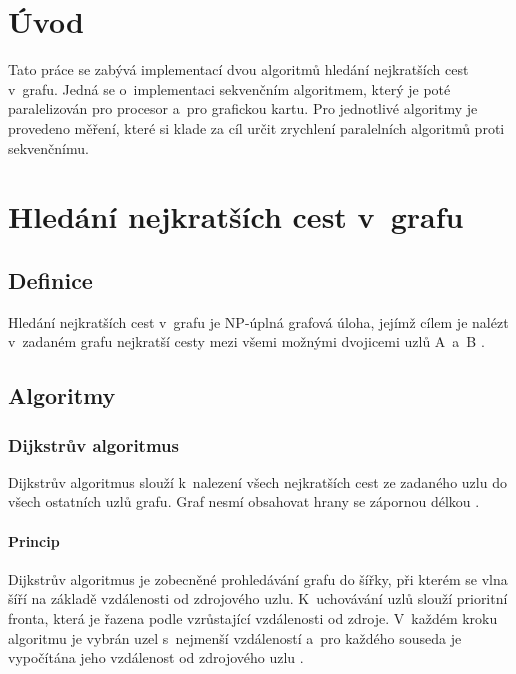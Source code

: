 
\clearpage

\tableofcontents

\clearpage

\section{Úvod}
Tato práce se zabývá implementací dvou algoritmů hledání nejkratších cest v~grafu. Jedná se o~implementaci sekvenčním algoritmem, který je poté paralelizován pro procesor a~pro grafickou kartu. Pro jednotlivé algoritmy je provedeno měření, které si klade za cíl určit zrychlení paralelních algoritmů proti sekvenčnímu.

\section{Hledání nejkratších cest v~grafu} \label{ncg}
\subsection{Definice} \label{l:clondike:ncgdef}
Hledání nejkratších cest v~grafu je NP-úplná grafová úloha, jejímž cílem je nalézt v~zadaném grafu nejkratší cesty mezi všemi možnými dvojicemi uzlů A~a~B \cite{w:ncg}.

\subsection{Algoritmy}
\subsubsection{Dijkstrův algoritmus}
Dijkstrův algoritmus slouží k~nalezení všech nejkratších cest ze zadaného uzlu do všech ostatních uzlů grafu. Graf nesmí obsahovat hrany se zápornou délkou \cite{w:dij:def}.

\paragraph{Princip}
Dijkstrův algoritmus je zobecněné prohledávání grafu do šířky, při kterém se vlna šíří na základě vzdálenosti od zdrojového uzlu. K~uchovávání uzlů slouží prioritní fronta, která je řazena podle vzrůstající vzdálenosti od zdroje. V~každém kroku algoritmu je vybrán uzel s~nejmenší vzdáleností a~pro každého souseda je vypočítána jeho vzdálenost od zdrojového uzlu \cite{w:dij:def}.

